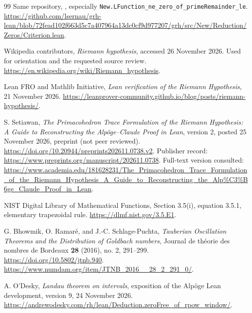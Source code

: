 \documentclass[11pt]{article}
\theoremstyle{definition}
\begin{document}
\begin{thebibliography}{99}
Same repository, ,
especially \texttt{New.LFunction\_ne\_zero\_of\_primeRemainder\_le}.
\url{https://github.com/lsernau/grh-lean/blob/72fead102f663d5c7a407964a13dc0cf9d977207/grh/src/New/Reduction/Zeros/Criterion.lean}.

Wikipedia contributors, \emph{Riemann hypothesis}, accessed
26 November 2026. Used for orientation and the requested source review.
\url{https://en.wikipedia.org/wiki/Riemann_hypothesis}.

Lean FRO and Mathlib Initiative, \emph{Lean verification of the Riemann
Hypothesis}, 21 November 2026.
\url{https://leanprover-community.github.io/blog/posts/riemann-hypothesis/}.

S. Setiawan, \emph{The Primacohedron Trace Formulation of the Riemann
Hypothesis: A Guide to Reconstructing the Alp\"oge--Claude Proof in Lean},
version 2, posted 25 November 2026, preprint (not peer reviewed).
\url{https://doi.org/10.20944/preprints202611.0738.v2}.
Publisher record: \url{https://www.preprints.org/manuscript/202611.0738}.
Full-text version consulted:
\url{https://www.academia.edu/181628231/The_Primacohedron_Trace_Formulation_of_the_Riemann_Hypothesis_A_Guide_to_Reconstructing_the_Alp%C3%B6ge_Claude_Proof_in_Lean}.

NIST Digital Library of Mathematical Functions, Section 3.5(i),
equation 3.5.1, elementary trapezoidal rule.
\url{https://dlmf.nist.gov/3.5.E1}.

G. Bhowmik, O. Ramar\'e, and J.-C. Schlage-Puchta,
\emph{Tauberian Oscillation Theorems and the Distribution of Goldbach
numbers}, Journal de th\'eorie des nombres de Bordeaux
\textbf{28} (2016), no. 2, 291--299.
\url{https://doi.org/10.5802/jtnb.940}.
\url{https://www.numdam.org/item/JTNB_2016__28_2_291_0/}.

A. O'Desky, \emph{Landau theorem on intervals}, exposition of the
Alp\"oge Lean development, version 9, 24 November 2026.
\url{https://andrewodesky.com/rh/lean/Deduction.zeroFree_of_rpow_window/}.
\end{thebibliography}
\end{document}
